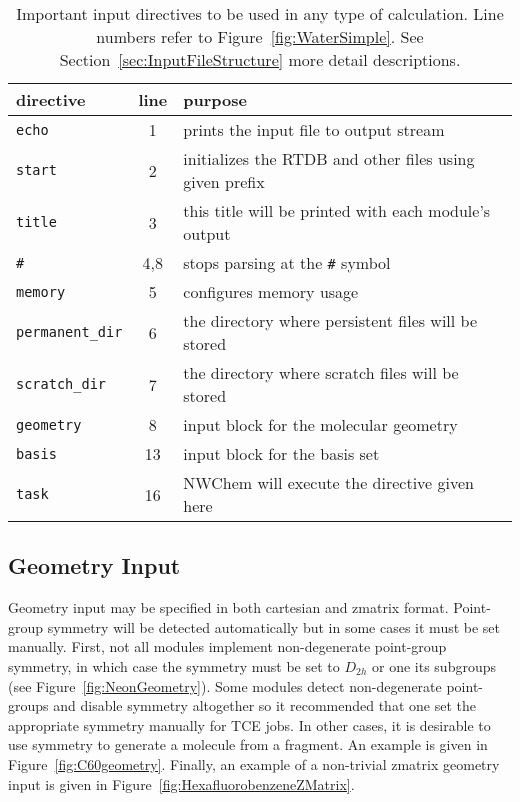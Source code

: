 \documentclass[letterpaper,12pt]{article}
\begin{document}
\begin{table}[!hp]
    \label{tab:BasicInput}
    \caption{Important input directives to be used in any type of calculation.  Line numbers refer to Figure~\ref{fig:WaterSimple}.  See Section~\ref{sec:InputFileStructure} more detail descriptions.}
    \begin{tabular}{lcl}
        \hline\hline
        directive               & line  & purpose \\
        \hline
        \texttt{echo}           & 1   & prints the input file to output stream \\
        \texttt{start}          & 2   & initializes the RTDB and other files using given prefix \\
        \texttt{title}          & 3   & this title will be printed with each module's output \\
        \texttt{\#}             & 4,8 & stops parsing at the \texttt{\#} symbol \\
        \texttt{memory}         & 5   & configures memory usage \\
        \texttt{permanent\_dir} & 6   & the directory where persistent files will be stored \\
        \texttt{scratch\_dir}   & 7   & the directory where scratch files will be stored \\
        \texttt{geometry}       & 8   & input block for the molecular geometry \\
        \texttt{basis}          & 13  & input block for the basis set \\
        \texttt{task}           & 16  & NWChem will execute the directive given here \\
        \hline\hline
    \end{tabular}
\end{table}

\newpage

\subsection{Geometry Input}\label{sec:GeometryInput}

Geometry input may be specified in both cartesian and zmatrix format.  Point-group symmetry will be detected automatically but in some cases it must be set manually.  First, not all modules implement non-degenerate point-group symmetry, in which case the symmetry must be set to $D_{2h}$ or one its subgroups (see Figure~\ref{fig:NeonGeometry}).  Some modules detect non-degenerate point-groups and disable symmetry altogether so it recommended that one set the appropriate symmetry manually for TCE jobs.  In other cases, it is desirable to use symmetry to generate a molecule from a fragment.  An example is given in Figure~\ref{fig:C60geometry}.  Finally, an example of a non-trivial zmatrix geometry input is given in Figure~\ref{fig:HexafluorobenzeneZMatrix}.
\end{document}
